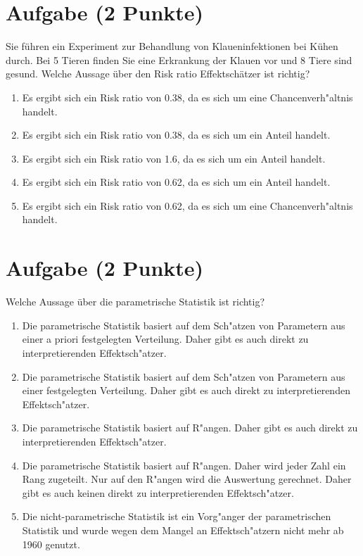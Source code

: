 \documentclass[a4paper, 10pt]{scrartcl}\usepackage[]{graphicx}\usepackage[]{xcolor}
\begin{document}
\section{Aufgabe \hfill (2 Punkte)}



Sie f{\"u}hren ein Experiment zur Behandlung von Klaueninfektionen bei K{\"u}hen
durch. Bei 5 Tieren finden Sie eine Erkrankung der Klauen vor und
8 Tiere sind gesund. Welche Aussage {\"u}ber den Risk ratio
Effektsch{\"a}tzer ist richtig?



\begin{enumerate}
\item [\textbf{A} \msquare] Es ergibt sich ein Risk ratio von 0.38, da es sich um eine Chancenverh{"a}ltnis handelt.
\item [\textbf{B} \msquare] Es ergibt sich ein Risk ratio von 0.38, da es sich um ein Anteil handelt.
\item [\textbf{C} \msquare] Es ergibt sich ein Risk ratio von 1.6, da es sich um ein Anteil handelt.
\item [\textbf{D} \msquare] Es ergibt sich ein Risk ratio von 0.62, da es sich um ein Anteil handelt.
\item [\textbf{E} \msquare] Es ergibt sich ein Risk ratio von 0.62, da es sich um eine Chancenverh{"a}ltnis handelt.
\end{enumerate}

\section{Aufgabe \hfill (2 Punkte)}




Welche Aussage {\"u}ber die parametrische Statistik ist richtig?



\begin{enumerate}
\item [\textbf{A} \msquare] Die parametrische Statistik basiert auf dem Sch{"a}tzen von Parametern aus einer a priori festgelegten Verteilung. Daher gibt es auch direkt zu interpretierenden Effektsch{"a}tzer.
\item [\textbf{B} \msquare] Die parametrische Statistik basiert auf dem Sch{"a}tzen von Parametern aus einer festgelegten Verteilung. Daher gibt es auch direkt zu interpretierenden Effektsch{"a}tzer.
\item [\textbf{C} \msquare] Die parametrische Statistik basiert auf R{"a}ngen. Daher gibt es auch direkt zu interpretierenden Effektsch{"a}tzer.
\item [\textbf{D} \msquare] Die parametrische Statistik basiert auf R{"a}ngen. Daher wird jeder Zahl ein Rang zugeteilt. Nur auf den R{"a}ngen wird die Auswertung gerechnet. Daher gibt es auch keinen direkt zu interpretierenden Effektsch{"a}tzer.
\item [\textbf{E} \msquare] Die nicht-parametrische Statistik ist ein Vorg{"a}nger der parametrischen Statistik und wurde wegen dem Mangel an Effektsch{"a}tzern nicht mehr ab 1960 genutzt.
\end{enumerate}
\end{document}
